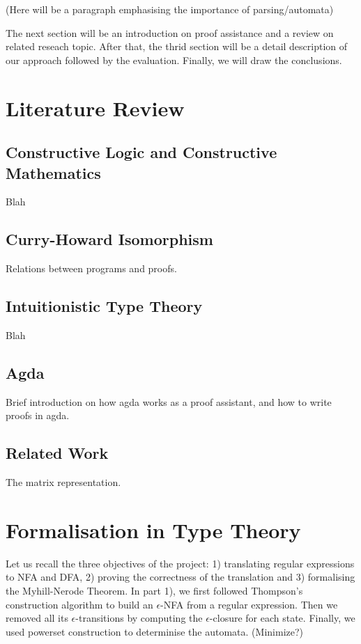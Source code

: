 \documentclass[twoside,openright,final]{bhamthesis}
\begin{document}
\par (Here will be a paragraph emphasising the importance of
parsing/automata)

\par The next section will be an introduction on proof assistance and
a review on related reseach topic. After that, the thrid section will
be a detail description of our approach followed by the
evaluation. Finally, we will draw the conclusions. 


\section{Literature Review}
\subsection{Constructive Logic and Constructive Mathematics}
Blah
\subsection{Curry-Howard Isomorphism}
Relations between programs and proofs.
\subsection{Intuitionistic Type Theory}
Blah
\subsection{Agda}
Brief introduction on how agda works as a proof assistant, and how to
write proofs in agda.
\subsection{Related Work}
The matrix representation.


\section{Formalisation in Type Theory}
Let us recall the three objectives of the project: 1) translating
regular expressions to NFA and DFA, 2) proving the correctness of the translation 
and 3) formalising the Myhill-Nerode Theorem. In part 1), we first followed Thompson's
construction algorithm to build an \(\epsilon\)-NFA from a
regular expression. Then we removed all its \(\epsilon\)-transitions by computing the
\(\epsilon\)-closure for each state. Finally, we used powerset
construction to determinise the automata. (Minimize?) 
\end{document}
